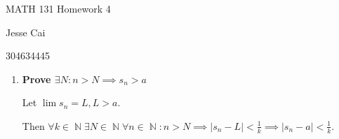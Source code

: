 \documentclass[10pt,a4paper]{article}
\DeclareMathOperator*{\N}{\mathbb{N}}
\begin{document}
MATH 131 Homework 4

Jesse Cai

304634445

\begin{enumerate}
    \item \textbf{Prove $\exists N : n > N \implies s_n > a$}

    Let $\lim s_n = L, L > a$. 

    Then $\forall k \in \N \exists N \in \N \forall n \in \N : n > N \implies \lvert s_n - L \rvert < \frac{1}{k} \implies \lvert s_n - a \rvert < \frac{1}{k}$.

\end{enumerate}
\end{document}
